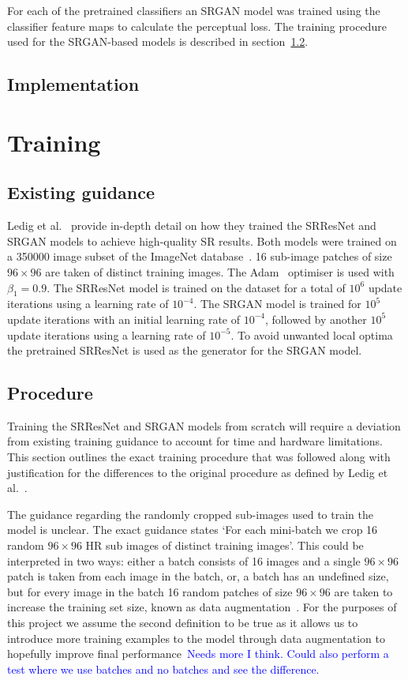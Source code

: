 For each of the pretrained classifiers an SRGAN model was trained using the classifier feature maps to calculate the perceptual loss. The training procedure used for the SRGAN-based models is described in section~\ref{subsec:procedure}.

\subsection{Implementation}

\section{Training}

\subsection{Existing guidance}
Ledig et al.~\cite{srgan} provide in-depth detail on how they trained the SRResNet and SRGAN models to achieve high-quality SR results. Both models were trained on a 350000 image subset of the ImageNet database~\cite{ref}. 16 sub-image patches of size $96 \times 96$ are taken of distinct training images. The Adam~\cite{ref} optimiser is used with $\beta_1 = 0.9$. The SRResNet model is trained on the dataset for a total of $10^6$ update iterations using a learning rate of $10^{-4}$. The SRGAN model is trained for $10^5$ update iterations with an initial learning rate of $10^{-4}$, followed by another $10^5$ update iterations using a learning rate of $10^{-5}$. To avoid unwanted local optima the pretrained SRResNet is used as the generator for the SRGAN model.

\subsection{Procedure}\label{subsec:procedure}
Training the SRResNet and SRGAN models from scratch will require a deviation from existing training guidance to account for time and hardware limitations. This section outlines the exact training procedure that was followed along with justification for the differences to the original procedure as defined by Ledig et al.~\cite{srgan}.

The guidance regarding the randomly cropped sub-images used to train the model is unclear. The exact guidance states `For each mini-batch we crop 16 random $96 \times 96$ HR sub images of distinct training images'. This could be interpreted in two ways: either a batch consists of 16 images and a single $96 \times 96$ patch is taken from each image in the batch, or, a batch has an undefined size, but for every image in the batch 16 random patches of size $96 \times 96$ are taken to increase the training set size, known as data augmentation~\cite{ref}. For the purposes of this project we assume the second definition to be true as it allows us to introduce more training examples to the model through data augmentation to hopefully improve final performance\ \textcolor{blue}{Needs more I think. Could also perform a test where we use batches and no batches and see the difference.}

